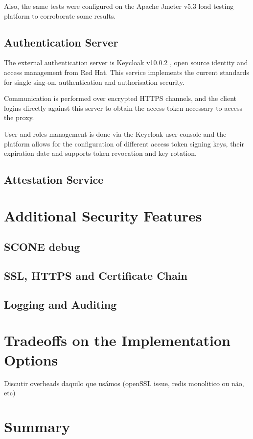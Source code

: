 Also, the same tests were configured on the Apache Jmeter v5.3\cite{jmeter:1} load testing platform to corroborate some results.

\subsection{Authentication Server}
\label{ssec:implementation_authentication_server}

The external authentication server is Keycloak v10.0.2 \cite{keycloak:1}, open source identity and access management from Red Hat. This service implements the current standards for single sing-on, authentication and authorisation security.

Communication is performed over encrypted \gls{HTTPS} channels, and the client logins directly against this server to obtain the access token necessary to access the proxy.

User and roles management is done via the Keycloak user console and the platform allows for the configuration of different access token signing keys, their expiration date and supports token revocation and key rotation.

\subsection{Attestation Service}
\label{ssec:attestation_service}

\section{Additional Security Features}
\label{sec:additional_security_features}

\subsection{SCONE debug}
\label{ssec:scone_debug}

\subsection{SSL, HTTPS and Certificate Chain}
\label{ssec:ssl_https_certificate_chain}

\subsection{Logging and Auditing} 
\label{sec:logging_and_auditing}

\section{Tradeoffs on the Implementation Options}
\label{sec:tradeoffs_implementation_options}

Discutir overheads daquilo que usámos (openSSL issue, redis monolitico ou não, etc)

\section{Summary}
\label{sec:chapter4_summary}